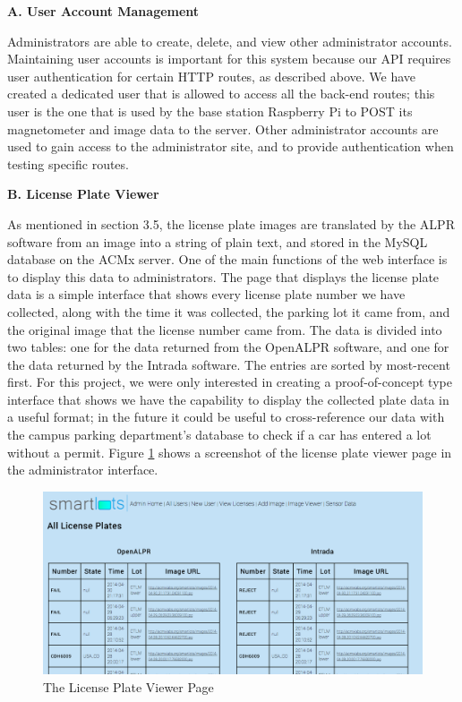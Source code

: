 \documentclass[11pt, oneside, fullpage, doublespace]{article}
\begin{document}
\textbf{A. User Account Management}

Administrators are able to create, delete, and view other administrator accounts. Maintaining user accounts is important for this system because our API requires user authentication for certain HTTP routes, as described above. We have created a dedicated user that is allowed to access all the back-end routes; this user is the one that is used by the base station Raspberry Pi to POST its magnetometer and image data to the server. Other administrator accounts are used to gain access to the administrator site, and to provide authentication when testing specific routes.

\textbf{B. License Plate Viewer}

As mentioned in section 3.5, the license plate images are translated by the ALPR software from an image into a string of plain text, and stored in the MySQL database on the ACMx server. One of the main functions of the web interface is to display this data to administrators. The page that displays the license plate data is a simple interface that shows every license plate number we have collected, along with the time it was collected, the parking lot it came from, and the original image that the license number came from. The data is divided into two tables: one for the data returned from the OpenALPR software, and one for the data returned by the Intrada software. The entries are sorted by most-recent first. For this project, we were only interested in creating a proof-of-concept type interface that shows we have the capability to display the collected plate data in a useful format; in the future it could be useful to cross-reference our data with the campus parking department's database to check if a car has entered a lot without a permit. Figure \ref{fig:licenseViewer} shows a screenshot of the license plate viewer page in the administrator interface.

\begin{figure}
\begin{center}
\includegraphics[width=5in]{adminpage}
\end{center}
\caption{The License Plate Viewer Page}
\label{fig:licenseViewer}
\end{figure}
\end{document}
